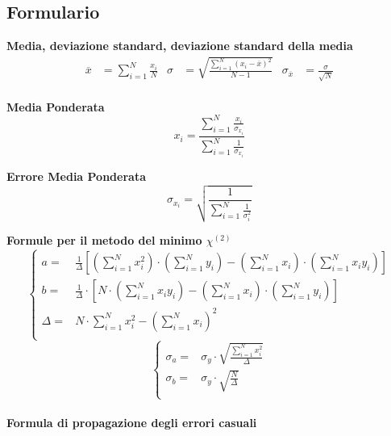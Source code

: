 \documentclass[a4paper,11pt,oneside]{article}
\begin{document}
\subsection{Formulario}
\textbf{Media, deviazione standard, deviazione standard della media}
\begin{align*}
        \overline{x}&=\sum\limits_{i=1}^{N} \frac{x_{i}}{N}&
        \sigma&=\sqrt{\frac{\sum\limits_{i=1}^{N} (x_{i}-\overline{x})^2}{N-1}}&
        \sigma_{\overline{x}}&=\frac{\sigma}{\sqrt{N}}
\end{align*}\\

\textbf{Media Ponderata}
\begin{equation*}
\label{eq:media_pond}
    x_i=\frac{\sum_{i=1}^{N}\frac{x_i}{\sigma_{x_i}}}{\sum_{i=1}^{N}\frac{1}{\sigma_{x_i}}}
\end{equation*}

\textbf{Errore Media Ponderata}
\begin{equation*}
\label{eq:errore_media_pond}
     \sigma_{x_i}=\sqrt{\frac{1}{\sum_{i=1}^{N}\frac{1}{\sigma_{i}^{2}}}}
\end{equation*}

\textbf{Formule per il metodo del minimo ${\chi}^{(2)}$}
\begin{equation*}
        \begin{cases}
    a=&\frac{1}{\Delta}[(\sum\limits_{i=1}^{N}{x_{i}^{2}})\cdot(\sum\limits_{i=1}^{N}{y_{i}})-(\sum\limits_{i=1}^{N}{x_{i}})\cdot(\sum\limits_{i=1}^{N}{x_{i}y_{i}})] \\ 
    b=&\frac{1}{\Delta }\cdot \left [N\cdot \left ( \sum\limits_{i=1}^{N}x_i y_i \right )-\left ( \sum\limits_{i=1}^{N}x_i \right )\cdot \left ( \sum\limits_{i=1}^{N}y_i \right )  \right ]\\
    \Delta=& N\cdot \sum\limits_{i=1}^{N} x_i^{2} - \left ( \sum\limits_{i=1}^{N}x_i \right )^{2}\\
    \end{cases}
\end{equation*}
\begin{equation*}
    \begin{cases}
    \sigma_{a}=&\sigma_{y}\cdot\sqrt{\frac{\sum_{i=1}^{N}{x_{i}^{2}}}{\Delta}} \\
    \sigma_{b}=&\sigma_y\cdot \sqrt{\frac{N}{\Delta }}\\
    \end{cases}
    \label{equation:err_chi_quadro}
\end{equation*}
\\
\textbf{Formula di propagazione degli errori casuali}\\
\end{document}
